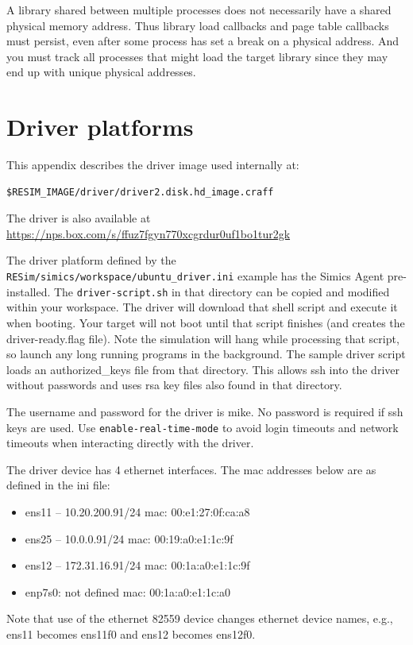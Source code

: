 \documentclass[titlepage]{article}
\begin{document}
\begin{appendices}
A library shared between multiple processes does not necessarily have a shared physical memory address.  Thus library load callbacks and page table callbacks
must persist, even after some process has set a break on a physical address.  And you must track all processes that might load the target library since they may
end up with unique physical addresses.

\section{Driver platforms}
\label{driver}
This appendix describes the driver image used internally at:
\begin{verbatim}
$RESIM_IMAGE/driver/driver2.disk.hd_image.craff
\end{verbatim}
The driver is also available at \url{https://nps.box.com/s/ffuz7fgyn770xcgrdur0uf1bo1tur2gk}

The driver platform defined by the {\tt RESim/simics/workspace/ubuntu\_driver.ini} example has the Simics Agent pre-installed.  The
{\tt driver-script.sh} in that directory can be copied and modified within your workspace.  The driver will download that shell script and execute
it when booting.  Your target will not boot until that script finishes (and creates the driver-ready.flag file).
Note the simulation will hang while processing that script, so launch any long running programs in the background.
The sample driver script loads an authorized\_keys file from that directory.  This allows ssh into the driver without passwords and uses
rsa key files also found in that directory.

The username and password for the driver is mike. No password is required if ssh keys are used.  Use {\tt enable-real-time-mode} to avoid login timeouts and network timeouts when
interacting directly with the driver.  

The driver device has 4 ethernet interfaces.  The mac addresses below are as defined in the ini file:
\begin{itemize}
\item ens11 -- 10.20.200.91/24  mac: 00:e1:27:0f:ca:a8
\item ens25 -- 10.0.0.91/24     mac: 00:19:a0:e1:1c:9f
\item ens12 -- 172.31.16.91/24  mac: 00:1a:a0:e1:1c:9f
\item enp7s0:  not defined      mac: 00:1a:a0:e1:1c:a0 
\end{itemize}
Note that use of the ethernet 82559 device changes ethernet device names, e.g., ens11 becomes ens11f0 and ens12 becomes ens12f0.


\end{appendices}
\end{document}
